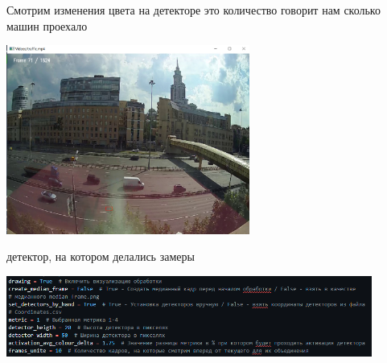 \documentclass[a4paper,12pt]{article}
\begin{document}
Смотрим изменения цвета на детекторе это количество говорит нам сколько машин проехало
\begin{center}
\includegraphics*[width=0.6\textwidth]{images/one_detector.jpg}
\end{center}
\begin{center}
    детектор, на котором делались замеры
\end{center}
\begin{center}
\includegraphics[width=0.9\textwidth]{images/detector_code.png}
\end{center}
\end{document}
